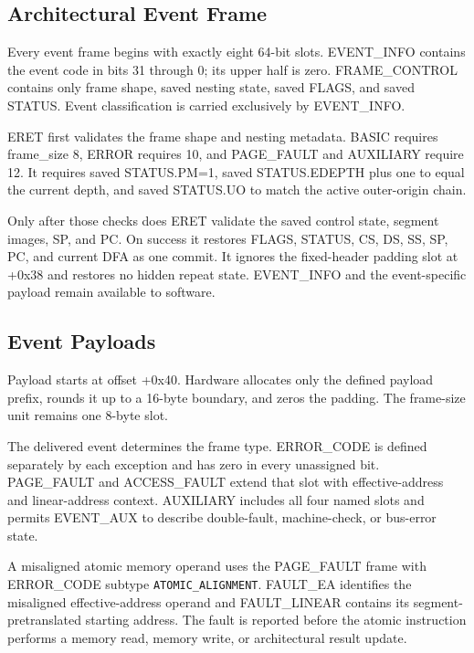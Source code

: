 \clearpage
\subsection{Architectural Event Frame}
Every event frame begins with exactly eight 64-bit slots. EVENT\_INFO contains the event code in bits 31 through 0;
its upper half is zero. FRAME\_CONTROL contains only frame shape, saved nesting state, saved FLAGS, and saved STATUS.
Event classification is carried exclusively by EVENT\_INFO.









ERET first validates the frame shape and nesting metadata. BASIC requires frame\_size 8, ERROR requires 10, and
PAGE\_FAULT and AUXILIARY require 12. It requires saved STATUS.PM=1, saved STATUS.EDEPTH plus one to equal the
current depth, and saved STATUS.UO to match the active outer-origin chain.

Only after those checks does ERET validate the saved control state, segment images, SP, and PC.
On success it restores FLAGS, STATUS, CS, DS, SS, SP, PC, and current DFA as one commit. It ignores the
fixed-header padding slot at +0x38 and restores no hidden repeat state. EVENT\_INFO and the event-specific payload
remain available to software.

\subsection{Event Payloads}
Payload starts at offset +0x40. Hardware allocates only the defined payload prefix, rounds it up to a 16-byte
boundary, and zeros the padding. The frame-size unit remains one 8-byte slot.



The delivered event determines the frame type. ERROR\_CODE is defined
separately by each exception and has zero in every unassigned bit. PAGE\_FAULT and ACCESS\_FAULT extend that slot with
effective-address and linear-address context. AUXILIARY includes all four named slots and permits EVENT\_AUX to
describe double-fault, machine-check, or bus-error state.

A misaligned atomic memory operand uses the PAGE\_FAULT frame with ERROR\_CODE subtype
\texttt{ATOMIC\_ALIGNMENT}. FAULT\_EA identifies the misaligned effective-address operand and FAULT\_LINEAR contains
its segment-pretranslated starting address. The fault is reported before the atomic instruction performs a memory
read, memory write, or architectural result update.

